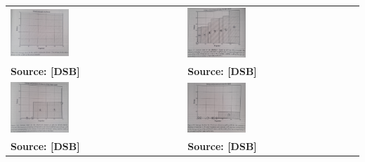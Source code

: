     \begin{tabular}{p{}p{}}
      \includegraphics[width=0.35\textwidth]{mushroom_all.png} & \includegraphics[width=0.35\textwidth]{mushroom_gill-color.png} \\  [-1.5ex]
      {\fontsize{10}{0}\selectfont \textbf{Source: [DSB]}} & {\fontsize{10}{0}\selectfont \textbf{Source: [DSB]}} \\
      \includegraphics[width=0.35\textwidth]{mushroom_spore-print-color.png} & \includegraphics[width=0.35\textwidth]{mushroom_odor.png} \\ [-1.5ex]
      {\fontsize{10}{0}\selectfont \textbf{Source: [DSB]}} & {\fontsize{10}{0}\selectfont \textbf{Source: [DSB]}} \\
    \end{tabular}
   
  \newpage

